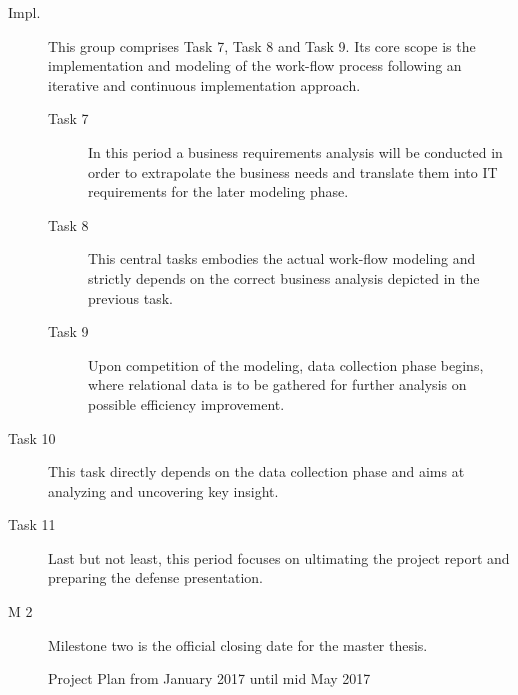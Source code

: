 \documentclass{seal_thesis}
\begin{document}
\begin{description}
	\item[Impl.] This group comprises Task 7, Task 8 and Task 9. Its core scope is the implementation and modeling of the work-flow process following an iterative and continuous implementation approach.
	\begin{description}
		\item[Task 7] In this period a business requirements analysis will be conducted in order to extrapolate the business needs and translate them into IT requirements for the later modeling phase.
		\item[Task 8] This central tasks embodies the actual work-flow modeling and strictly depends on the correct business analysis depicted in the previous task.
		\item[Task 9] Upon competition of the modeling,  data collection phase begins, where relational data is to be gathered for further analysis on possible efficiency improvement.
	\end{description}
	\item[Task 10] This task directly depends on the data collection phase and aims at analyzing and uncovering key insight.
	\item[Task 11] Last but not least, this period focuses on ultimating the project report and preparing the defense presentation.
	\item[M 2] Milestone two is the official closing date for the master thesis.
\end{description}

\begin{figure}[H]

\noindent{}
	\caption{Project Plan from January 2017 until mid May 2017}
\end{figure}
\end{document}
